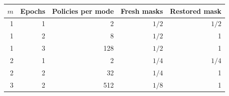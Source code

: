 \begin{tabular}{rrrrr}
\toprule
$m$ & Epochs & Policies per mode & Fresh masks & Restored mask \\
\midrule
1 & 1 & 2 & $1/2$ & $1/2$ \\
1 & 2 & 8 & $1/2$ & 1 \\
1 & 3 & 128 & $1/2$ & 1 \\
2 & 1 & 2 & $1/4$ & $1/4$ \\
2 & 2 & 32 & $1/4$ & 1 \\
3 & 2 & 512 & $1/8$ & 1 \\
\bottomrule
\end{tabular}

